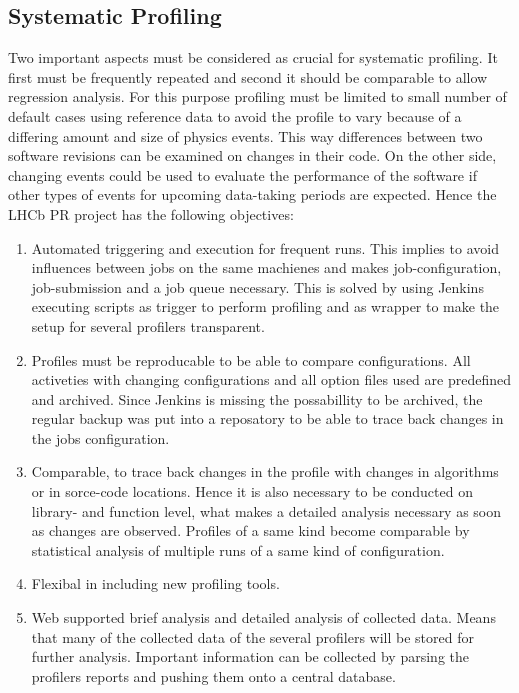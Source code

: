 \documentclass[a4paper]{jpconf}
\begin{document}
\subsection{Systematic Profiling}
\label{sec:integrated_profiling}

Two important aspects must be considered as crucial for systematic profiling. It first must be frequently repeated and second it should be comparable to allow regression analysis. For this purpose profiling must be limited to small number of default cases using reference data to avoid the profile to vary because of a differing amount and size of physics events. This way differences between two software revisions can be examined on changes in their code. On the other side, changing events could be used to evaluate the performance of the software if other types of events for upcoming data-taking periods are expected.
\newline
Hence the LHCb PR project has the following objectives:
\begin{enumerate}
 \item Automated triggering and execution for frequent runs. This implies to avoid influences between jobs on the same machienes and makes job-configuration, job-submission and a job queue necessary. This is solved by using Jenkins \cite{jenkins} executing scripts as trigger to perform profiling and as wrapper to make the setup for several profilers transparent.
 \item Profiles must be reproducable to be able to compare configurations. All activeties with changing configurations and all option files used are predefined and archived. Since Jenkins is missing the possabillity to be archived, the regular backup was put into a reposatory to be able to trace back changes in the jobs configuration.
 \item Comparable, to trace back changes in the profile with changes in algorithms or in sorce-code locations. Hence it is also necessary to be conducted on library- and function level, what makes a detailed analysis necessary as soon as changes are observed. Profiles of a same kind become comparable by statistical analysis of multiple runs of a same kind of configuration.
 \item Flexibal in including new profiling tools.
 \item Web supported brief analysis and detailed analysis of collected data. Means that many of the collected data of the several profilers will be stored for further analysis. Important information can be collected by parsing the profilers reports and pushing them onto a central database.
\end{enumerate}
\end{document}
